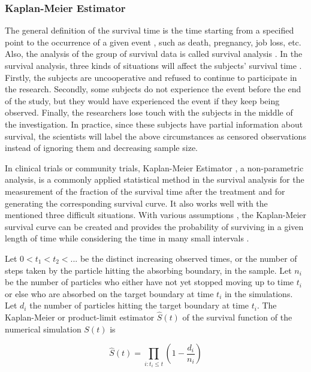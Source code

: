\subsubsection{Kaplan-Meier Estimator}

The general definition of the survival time is the time starting from
a specified point to the occurrence of a given
event \cite{bewick2004statistics}, such as death, pregnancy, job loss,
etc. Also, the analysis of the group of survival data is called
survival analysis \cite{altman1990practical}. In the survival
analysis, three kinds of situations will affect the subjects' survival
time \cite{goel2010understanding}. Firstly, the subjects are
uncooperative and refused to continue to participate in the
research. Secondly, some subjects do not experience the event before
the end of the study, but they would have experienced the event if
they keep being observed. Finally, the researchers lose touch with the
subjects in the middle of the investigation. In practice, since these
subjects have partial information about survival, the scientists will
label the above circumstances as censored
observations \cite{bewick2004statistics} instead of ignoring them and
decreasing sample size.

In clinical trials or community trials, Kaplan-Meier
Estimator \cite{kaplan1958nonparametric}, a non-parametric analysis,
is a commonly applied statistical method in the survival analysis for
the measurement of the fraction of the survival time after the
treatment \cite{aalen2008survival} and for generating the
corresponding survival curve. It also works well with the mentioned
three difficult situations. With various
assumptions \cite{etikan2017kaplan} \cite{goel2010understanding}, the
Kaplan-Meier survival curve can be created and provides the
probability of surviving in a given length of time while considering
the time in many small intervals \cite{altman1990practical}.


Let $0 < t_1 < t_2 < ...$ be the distinct increasing observed times,
or the number of steps taken by the particle hitting the
absorbing boundary, in the sample. Let $n_i$ be the number of particles
who either have not yet stopped moving up to time $t_i$ or else who
are absorbed on the target boundary at time $t_i$ in the
simulations. Let $d_i$ the number of particles hitting the target
boundary at time $t_i$. The Kaplan-Meier or product-limit estimator
$\widehat{S}(t)$ of the survival function of the numerical simulation
$S(t)$ is \cite{aalen2008survival}

\begin{equation}
  \widehat{S}(t) = \prod_{i:t_i \leq t} (1 - \frac{d_i}{n_i})
\end{equation}




